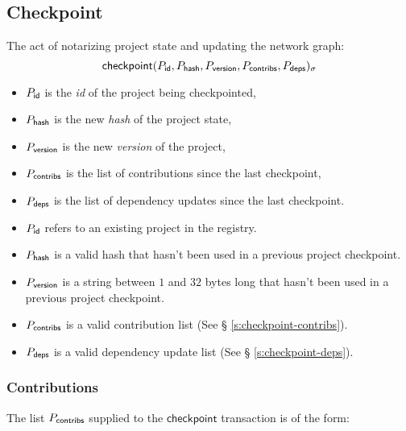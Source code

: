 \subsection{Checkpoint}
\label{s:checkpoint}
The act of notarizing project state and updating the network graph:
\[
    \mathsf{checkpoint}\lparen P_{\mathsf{id}}, P_{\mathsf{hash}}, P_{\mathsf{version}}, P_{\mathsf{contribs}}, P_{\mathsf{deps}}\rparen_\sigma
\]
\begin{itemize}
    \item $P_{\mathsf{id}}$ is the \emph{id} of the project being checkpointed,
    \item $P_{\mathsf{hash}}$ is the new \emph{hash} of the project state,
    \item $P_{\mathsf{version}}$ is the new \emph{version} of the project,
    \item $P_{\mathsf{contribs}}$ is the list of contributions since the last checkpoint,
    \item $P_{\mathsf{deps}}$ is the list of dependency updates since the last checkpoint.
\end{itemize}
\validation
\begin{itemize}
    \item{$P_{\mathsf{id}}$ refers to an existing project in the registry.}
    \item{$P_{\mathsf{hash}}$ is a valid hash that hasn't been used in a previous
        project checkpoint.}
    \item{$P_{\mathsf{version}}$ is a string between $1$ and $32$ bytes long that
        hasn't been used in a previous project checkpoint.}
    \item{$P_{\mathsf{contribs}}$ is a valid contribution list (See \S
        \ref{s:checkpoint-contribs}).}
    \item{$P_{\mathsf{deps}}$ is a valid dependency update list (See \S
        \ref{s:checkpoint-deps}).}
\end{itemize}

\subsubsection{Contributions}
The list $P_{\mathsf{contribs}}$ supplied to the $\mathsf{checkpoint}$
transaction is of the form:

